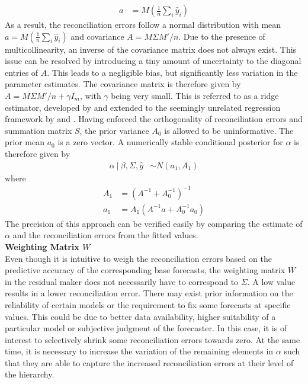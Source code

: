 \documentclass[a4paper,fleqn,11pt]{article}
\begin{document}
\begin{enumerate}
\begin{align}
a &= M\left(\frac{1}{n}\sum_i \hat{y}_i\right)
\end{align}
As a result, the reconciliation errors follow a normal distribution with mean $a = M(\frac{1}{n}\sum_i \hat{y}_i)$ and covariance $A = M\Sigma M'/n$. Due to the presence of multicollinearity, an inverse of the covariance matrix does not always exist. This issue can be resolved by introducing a tiny amount of uncertainty to the diagonal entries of $A$. This leads to a negligible bias, but significantly less variation in the parameter estimates. The covariance matrix is therefore given by $A = M\Sigma M'/n + \gamma I_m$, with $\gamma$ being very small. This is referred to as a ridge estimator, developed by \cite{Brown1980} and extended to the seemingly unrelated regression framework by \cite{Haitovsky1987} and \cite{Firinguetti1997}. Having enforced the orthogonality of reconciliation errors and summation matrix $S$, the prior variance $A_0$ is allowed to be uninformative. The prior mean $a_0$ is a zero vector. A numerically stable conditional posterior for $\alpha$ is therefore given by
\begin{align}
	\label{eq:alpha}
	\alpha\ |\ \beta,\Sigma,\hat{y} &\sim N(a_1,A_1)
\end{align}
where
\begin{align*}
	A_1 &= \left(A^{-1} + A_0^{-1}\right)^{-1}\\
	a_1 &= A_1 \left(A^{-1}a + A_0^{-1}a_0\right)
\end{align*}
The precision of this approach can be verified easily by comparing the estimate of $\alpha$ and the reconciliation errors from the fitted values. \\

\textbf{Weighting Matrix $W$}\\
Even though it is intuitive to weigh the reconciliation errors based on the predictive accuracy of the corresponding base forecasts, the weighting matrix $W$ in the residual maker does not necessarily have to correspond to $\Sigma$. A low value results in a lower reconciliation error. There may exist prior information on the reliability of certain models or the requirement to fix some forecasts at specific values. This could be due to better data availability, higher suitability of a particular model or subjective judgment of the forecaster.  In this case, it is of interest to selectively shrink some reconciliation errors towards zero. At the same time, it is necessary to increase the variation of the remaining elements in $\alpha$ such that they are able to capture the increased reconciliation errors at their level of the hierarchy.


\end{enumerate}
\end{document}
